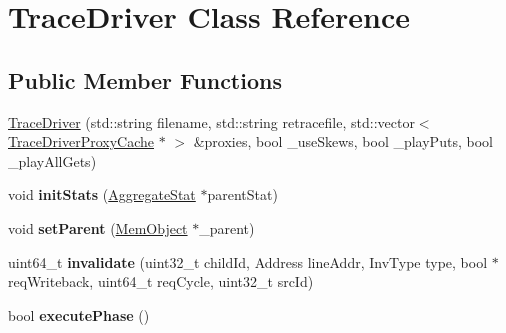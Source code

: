 \hypertarget{classTraceDriver}{\section{Trace\-Driver Class Reference}
\label{classTraceDriver}
}
\subsection*{Public Member Functions}
\begin{DoxyCompactItemize}
\item 
\hyperlink{classTraceDriver_ae708770486c6440a8eb8701ffd6fad50}{Trace\-Driver} (std\-::string filename, std\-::string retracefile, std\-::vector$<$ \hyperlink{classTraceDriverProxyCache}{Trace\-Driver\-Proxy\-Cache} $\ast$ $>$ \&proxies, bool \-\_\-use\-Skews, bool \-\_\-play\-Puts, bool \-\_\-play\-All\-Gets)
\item 
\hypertarget{classTraceDriver_aca88e790d641f617260c5ab78f0d4bda}{void {\bfseries init\-Stats} (\hyperlink{classAggregateStat}{Aggregate\-Stat} $\ast$parent\-Stat)}\label{classTraceDriver_aca88e790d641f617260c5ab78f0d4bda}

\item 
\hypertarget{classTraceDriver_a716278a5e66ad1f6667d56cc97107594}{void {\bfseries set\-Parent} (\hyperlink{classMemObject}{Mem\-Object} $\ast$\-\_\-parent)}\label{classTraceDriver_a716278a5e66ad1f6667d56cc97107594}

\item 
\hypertarget{classTraceDriver_af21744a0b4846afcfd7ccd410895203e}{uint64\-\_\-t {\bfseries invalidate} (uint32\-\_\-t child\-Id, Address line\-Addr, Inv\-Type type, bool $\ast$req\-Writeback, uint64\-\_\-t req\-Cycle, uint32\-\_\-t src\-Id)}\label{classTraceDriver_af21744a0b4846afcfd7ccd410895203e}

\item 
\hypertarget{classTraceDriver_af016df78eb21621e0ee391056e0695df}{bool {\bfseries execute\-Phase} ()}\label{classTraceDriver_af016df78eb21621e0ee391056e0695df}

\end{DoxyCompactItemize}


